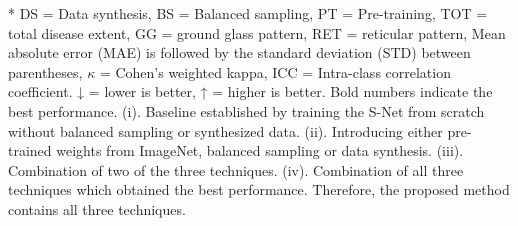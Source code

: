 \begin{table}
\begin{threeparttable}
\begin{tablenotes}
\item[*] DS = Data synthesis, BS = Balanced sampling, PT = Pre-training, TOT = total disease extent, GG = ground glass pattern, RET = reticular pattern, Mean absolute error (MAE) is followed by the standard deviation (STD) between parentheses, $\kappa$ = Cohen’s weighted kappa, ICC = Intra-class correlation coefficient. ↓ = lower is better, ↑ = higher is better. Bold numbers indicate the best performance. (i). Baseline established by training the S-Net from scratch without balanced sampling or synthesized data. (ii). Introducing either pre-trained weights from ImageNet, balanced sampling or data synthesis. (iii). Combination of two of the three techniques. (iv). Combination of all three techniques which obtained the best performance. Therefore, the proposed method contains all three techniques.
\end{tablenotes}
\end{threeparttable}
\end{table}



